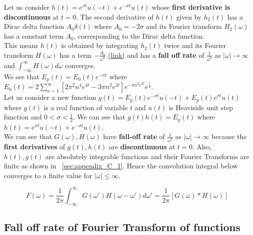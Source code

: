 \documentclass[11pt]{elsarticle}
\begin{document}
Let us consider $h(t)=  e^{ \sigma t} u(-t) + e^{ - \sigma t} u(t) $  whose \textbf{first derivative is discontinuous} at $t=0$. The second derivative of $h(t)$ given by $h_2(t)$ has a Dirac delta function $A_0 \delta(t)$ where $A_0=-2 \sigma$ and its Fourier transform $H_2(\omega)$ has a constant term $A_0$, corresponding to the Dirac delta function.\\

This means $h(t)$ is obtained by integrating $h_2(t)$ twice and its Fourier transform $H(\omega)$ has a term $-\frac{A_0}{\omega^2}$  \href{https://web.stanford.edu/class/ee102/lectures/fourtran#page=15}{(link)} and has a \textbf{fall off rate} of $\frac{1}{\omega^2}$ as $|\omega| \to \infty$ and  $\int_{-\infty}^{\infty} H(\omega) d\omega $ converges.\\

We see that $E_{p}(t) = E_0(t) e^{-\sigma t} $ where $E_0(t) = 2 \sum_{n=1}^{\infty}  [ 2 \pi^{2} n^{4} e^{4t}    - 3 \pi n^{2}   e^{2t} ]  e^{- \pi n^{2} e^{2t}} e^{\frac{t}{2}}  $.\\

Let us consider a new function  $g(t) = E_p(t) e^{-\sigma t}  u(-t) + E_p(t) e^{\sigma t}  u(t)  $ where $g(t)$ is a real function of variable $t$ and $u(t)$ is Heaviside unit step function and $0 < \sigma < \frac{1}{2}$. We can see that $g(t) h(t) = E_p(t)$ where $h(t)=  e^{ \sigma t} u(-t) + e^{ - \sigma t} u(t) $. \\

We can see that $G(\omega), H(\omega)$ have \textbf{fall-off rate }of $\frac{1}{\omega^2}$ as $|\omega| \to \infty$ because the \textbf{first derivatives }of $g(t), h(t)$ are \textbf{discontinuous} at $t=0$. Also, $h(t), g(t)$ are absolutely integrable functions and their Fourier Transforms are finite as shown in ~\ref{sec:appendix_C_1}. Hence the convolution integral below converges to a finite value for  $|\omega| \leq \infty$.

\begin{equation} \label{sec_C_1_eq_2}   
F(\omega) = \frac{1}{2 \pi}  \int_{-\infty}^{\infty} G(\omega') H(\omega - \omega') d\omega' = \frac{1}{2 \pi}  [ G(\omega) \ast H(\omega)]
\end{equation}

\subsection{\label{sec:appendix_C_3} \textbf{ Fall off rate of Fourier Transform of functions } \protect\\  \lowercase{} }
\end{document}
